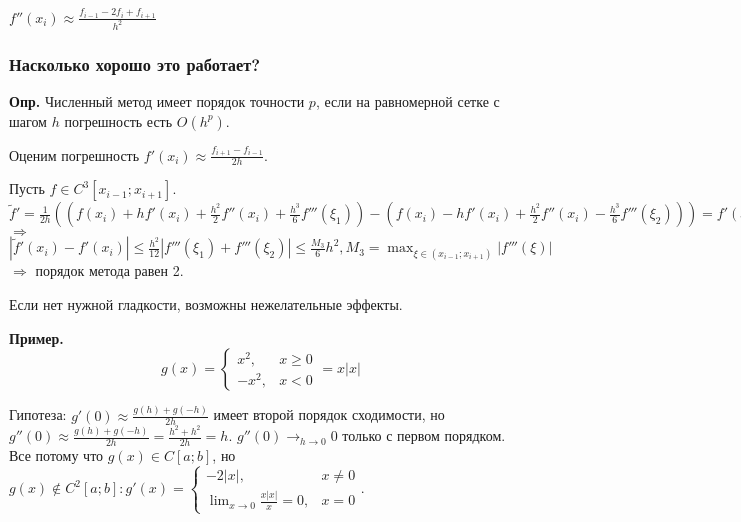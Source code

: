 $ f''(x_i) \approx \frac{f_{i-1} - 2 f_i + f_{i+1}}{h^2} $

\subsubsection{Насколько хорошо это работает?}

\textbf{Опр.}
Численный метод имеет порядок точности $p$, если на равномерной сетке с шагом $h$ погрешность есть $O(h^p)$.

Оценим погрешность $ f'(x_i) \approx \frac{f_{i+1} - f_{i-1}}{2h} $.

Пусть $ f \in C^3[x_{i-1}; x_{i+1}] $. $ \tilde{f}' = \frac{1}{2h} (
    (f(x_i) + h f'(x_i) + \frac{h^2}{2} f''(x_i) + \frac{h^3}{6} f'''(\xi_1)) - 
    (f(x_i) - h f'(x_i) + \frac{h^2}{2} f''(x_i) - \frac{h^3}{6} f'''(\xi_2)) 
) = f'(x_i) + \frac{h^2}{12} (
    f'''(\xi_1) + f'''(\xi_2)
); \xi_1, \xi_2 \in (x_{i-1}; x_{i+1}) $ $\Rightarrow$
$ | \tilde{f}'(x_i) - f'(x_i) | \leq \frac{h^2}{12} | f'''(\xi_1) + f'''(\xi_2) | \leq \frac{M_3}{6} h^2, M_3 = \max_{\xi \in (x_{i-1}; x_{i+1})} | f'''(\xi) | $ 
$\Rightarrow$ порядок метода равен 2.

Если нет нужной гладкости, возможны нежелательные эффекты.

\textbf{Пример.}
\begin{equation}
    g(x) = \begin{cases}
        x^2, & x \geq 0\\
        -x^2, & x < 0 
    \end{cases} = x |x|
\end{equation}

Гипотеза: $ g'(0) \approx \frac{g(h) + g(-h)}{2h} $ имеет второй порядок сходимости, но $ g''(0) \approx \frac{g(h) + g(-h)}{2h} = \frac{h^2 + h^2}{2h} = h $. $ g''(0) \to_{h \to 0} 0 $ только с первом порядком. Все потому что $ g(x) \in C[a; b] $, но $ g(x) \notin C^2 [a; b] : g'(x) = \begin{cases}
    -2 |x|, & x \not = 0 \\
    \lim_{x \to 0} \frac{x |x|}{x} = 0, & x = 0
\end{cases} $.
